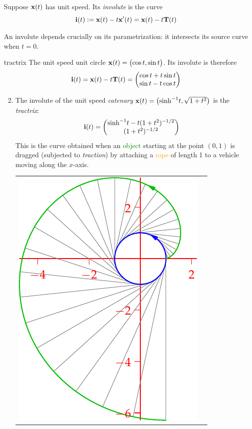 \begin{defn}{}{}
Suppose ${\mathbf{x}}(t)$ has unit speed. Its \emph{involute} is the curve
\[{\mathbf{i}}(t):={\mathbf{x}}(t)-t{\mathbf{x}}'(t)={\mathbf{x}}(t)-t{\mathbf{T}}(t)\]
\end{defn}

An involute depends crucially on its parametrization: it intersects its source curve when $t=0$.

\begin{examples}{}{tractrix}
\exstart The unit speed unit circle ${\mathbf{x}}(t)=\bigl(\cos t,\sin t\bigr)$. Its involute is therefore
\[
	{\mathbf{i}}(t)={\mathbf{x}}(t)-t{\mathbf{T}}(t)=\begin{pmatrix}\cos t+t\sin t\\\sin t-t\cos t\end{pmatrix}
\]
\begin{enumerate}\setcounter{enumi}{1}
  \item\label{ex:tractrix1} The involute of the unit speed \emph{catenary} ${\mathbf{x}}(t)=\bigl(\sinh^{-1}\!t,\sqrt{1+t^2}\bigr)$ is the \emph{tractrix}:
	\[{\mathbf{i}}(t)=\begin{pmatrix}\sinh^{-1}\!t-t(1+t^2)^{-1/2}\\(1+t^2)^{-1/2}\end{pmatrix}\]
	This is the curve obtained when an \textcolor{Green}{object} starting at the point $(0,1)$ is dragged (subjected to \emph{traction}) by attaching a \textcolor{orange}{rope} of length 1 to a vehicle moving along the $x$-axis.
	\begin{center}
		\begin{tabular}{c@{\qquad\qquad}c}
			\href{http://math.uci.edu/~ndonalds/math162a/radii-invcirc.html}{\includegraphics[scale=0.8]{radii-invcirc2}}

\end{tabular}
\end{center}
\end{enumerate}
\end{examples}
